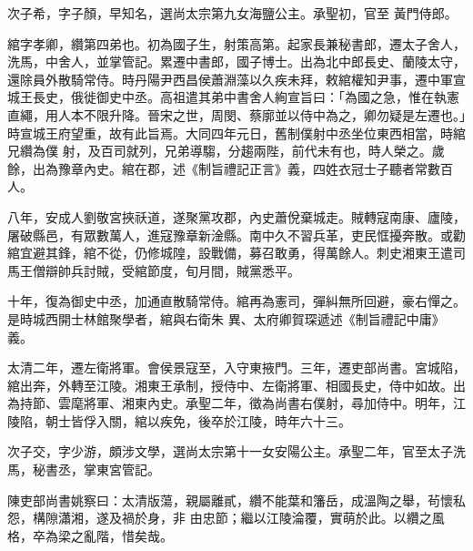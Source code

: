 \begin{pinyinscope}
 次子希，字子顏，早知名，選尚太宗第九女海鹽公主。承聖初，官至
 黃門侍郎。



 綰字孝卿，纘第四弟也。初為國子生，射策高第。起家長兼秘書郎，遷太子舍人，洗馬，中舍人，並掌管記。累遷中書郎，國子博士。出為北中郎長史、蘭陵太守，還除員外散騎常侍。時丹陽尹西昌侯蕭淵藻以久疾未拜，敕綰權知尹事，遷中軍宣城王長史，俄徙御史中丞。高祖遣其弟中書舍人絢宣旨曰：「為國之急，惟在執憲直繩，用人本不限升降。晉宋之世，周閔、蔡廓並以侍中為之，卿勿疑是左遷也。」時宣城王府望重，故有此旨焉。大同四年元日，舊制僕射中丞坐位東西相當，時綰兄纘為僕
 射，及百司就列，兄弟導騶，分趨兩陛，前代未有也，時人榮之。歲餘，出為豫章內史。綰在郡，述《制旨禮記正言》義，四姓衣冠士子聽者常數百人。



 八年，安成人劉敬宮挾祅道，遂聚黨攻郡，內史蕭侻棄城走。賊轉寇南康、廬陵，屠破縣邑，有眾數萬人，進寇豫章新淦縣。南中久不習兵革，吏民恇擾奔散。或勸綰宜避其鋒，綰不從，仍修城隍，設戰備，募召敢勇，得萬餘人。刺史湘東王遣司馬王僧辯帥兵討賊，受綰節度，旬月間，賊黨悉平。



 十年，復為御史中丞，加通直散騎常侍。綰再為憲司，彈糾無所回避，豪右憚之。是時城西開士林館聚學者，綰與右衛朱
 異、太府卿賀琛遞述《制旨禮記中庸》義。



 太清二年，遷左衛將軍。會侯景寇至，入守東掖門。三年，遷吏部尚書。宮城陷，綰出奔，外轉至江陵。湘東王承制，授侍中、左衛將軍、相國長史，侍中如故。出為持節、雲麾將軍、湘東內史。承聖二年，徵為尚書右僕射，尋加侍中。明年，江陵陷，朝士皆俘入關，綰以疾免，後卒於江陵，時年六十三。



 次子交，字少游，頗涉文學，選尚太宗第十一女安陽公主。承聖二年，官至太子洗馬，秘書丞，掌東宮管記。



 陳吏部尚書姚察曰：太清版蕩，親屬離貳，纘不能葉和籓岳，成溫陶之舉，茍懷私怨，構隙瀟湘，遂及禍於身，非
 由忠節；繼以江陵淪覆，實萌於此。以纘之風格，卒為梁之亂階，惜矣哉。



\end{pinyinscope}